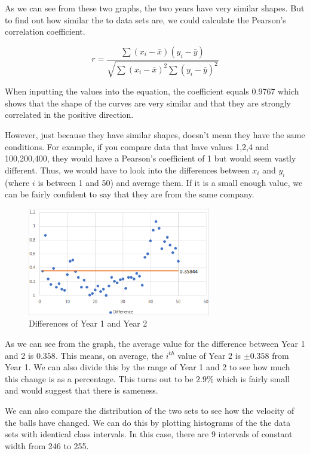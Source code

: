 \documentclass[11pt]{article}
\begin{document}
As we can see from these two graphs, the two years have very similar shapes. But to find out how similar the to data sets are, we could calculate the Pearson's correlation coefficient.\cite[~pg.107]{Definition}

$$r=\frac{\sum{(x_i-\bar{x})(y_i-\bar{y})}}{\sqrt{\sum(x_i-\bar{x})^2\sum(y_i-\bar{y})^2}}$$

When inputting the values into the equation, the coefficient equals 0.9767 which shows that the shape of the curves are very similar and that they are strongly correlated in the positive direction. 

However, just because they have similar shapes, doesn't mean they have the same conditions. For example, if you compare data that have values 1,2,4 and 100,200,400, they would have a Pearson's coefficient of 1 but would seem vastly different. Thus, we would have to look into the differences between $x_i$ and $y_i$ (where $i$ is between 1 and 50) and average them. If it is a small enough value, we can be fairly confident to say that they are from the same company.

\begin{figure}[H]
    \centering
    \includegraphics[width=80mm]{Difference.png}
    \caption{Differences of Year 1 and Year 2}
    \label{figure 12}
\end{figure}

As we can see from the graph, the average value for the difference between Year 1 and 2 is $0.358$. This means, on average, the $i^{th}$ value of Year 2 is $\pm0.358$ from Year 1. We can also divide this by the range of Year 1 and 2 to see how much this change is as a percentage. This turns out to be $2.9\%$ which is fairly small and would suggest that there is sameness.

We can also compare the distribution of the two sets to see how the velocity of the balls have changed. We can do this by plotting histograms of the the data sets with identical class intervals. In this case, there are 9 intervals of constant width from 246 to 255.
\end{document}
